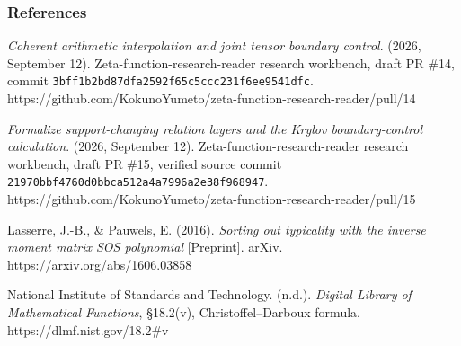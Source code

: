 \documentclass[
]{article}
\begin{document}
\subsubsection{References}\label{references}

\emph{Coherent arithmetic interpolation and joint tensor boundary
control}. (2026, September 12). Zeta-function-research-reader research
workbench, draft PR \#14, commit
\texttt{3bff1b2bd87dfa2592f65c5ccc231f6ee9541dfc}.
https://github.com/KokunoYumeto/zeta-function-research-reader/pull/14

\emph{Formalize support-changing relation layers and the Krylov
boundary-control calculation}. (2026, September 12).
Zeta-function-research-reader research workbench, draft PR \#15,
verified source commit
\texttt{21970bbf4760d0bbca512a4a7996a2e38f968947}.
https://github.com/KokunoYumeto/zeta-function-research-reader/pull/15

Lasserre, J.-B., \& Pauwels, E. (2016). \emph{Sorting out typicality
with the inverse moment matrix SOS polynomial} {[}Preprint{]}. arXiv.
https://arxiv.org/abs/1606.03858

National Institute of Standards and Technology. (n.d.). \emph{Digital
Library of Mathematical Functions}, §18.2(v), Christoffel--Darboux
formula. https://dlmf.nist.gov/18.2\#v
\end{document}
